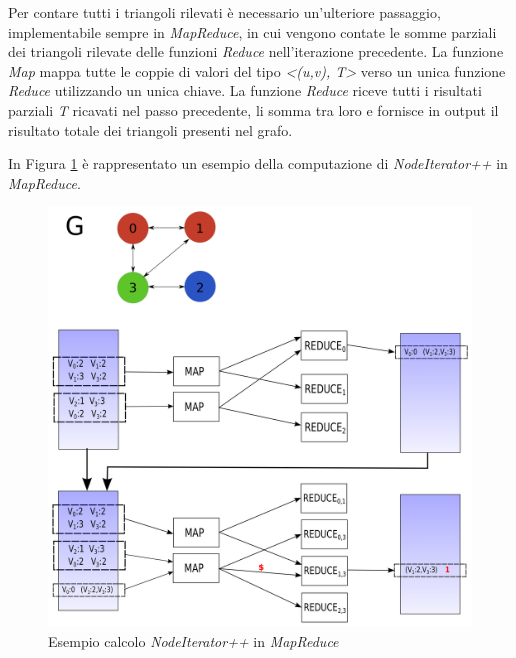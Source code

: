 \documentclass[LaM,binding=0.6cm]{sapthesis}
\begin{document}
Per contare tutti i triangoli rilevati è necessario un'ulteriore passaggio, implementabile sempre in \textit{MapReduce}, in cui vengono contate le somme parziali dei triangoli rilevate delle funzioni \textit{Reduce} nell'iterazione precedente. La funzione \textit{Map} mappa tutte le coppie di valori del tipo \textit{<(u,v), T>} verso un unica funzione \textit{Reduce} utilizzando un unica chiave. La funzione \textit{Reduce} riceve tutti i risultati parziali \textit{T} ricavati nel passo precedente, li somma tra loro e fornisce in output il risultato totale dei triangoli presenti nel grafo.

In Figura \ref{fig:MRNIT} è rappresentato un esempio della computazione di \textit{NodeIterator++} in \textit{MapReduce}.

\begin{minipage}{\linewidth}
	
\end{minipage}
\begin{minipage}{\linewidth}
	
\end{minipage}


\begin{figure}
\centering
\includegraphics[width=1\textwidth]{MR-trianglepp}
\caption{Esempio calcolo \textit{NodeIterator++} in \textit{MapReduce}}
\label{fig:MRNIT}
\end{figure}
\end{document}
